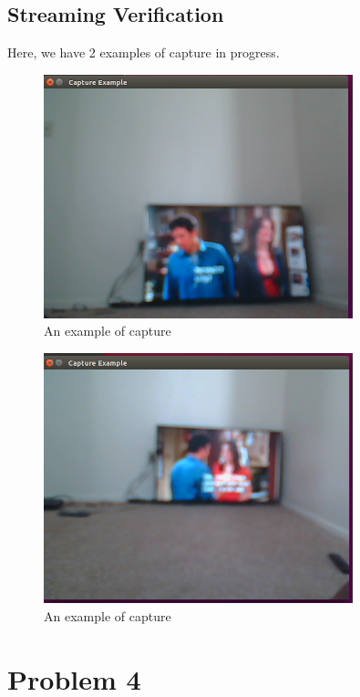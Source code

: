\documentclass{article}
\begin{document}
\subsection*{Streaming Verification}
Here, we have 2 examples of capture in progress.
\begin{figure}[H]
    \centering
    \includegraphics[width=0.8\textwidth]{Q3_1.png}
    \caption{An example of capture}
\end{figure}
\begin{figure}[H]
    \centering
    \includegraphics[width=0.8\textwidth]{Q3_2.png}
    \caption{An example of capture}
\end{figure}
\section*{Problem 4}
\end{document}
